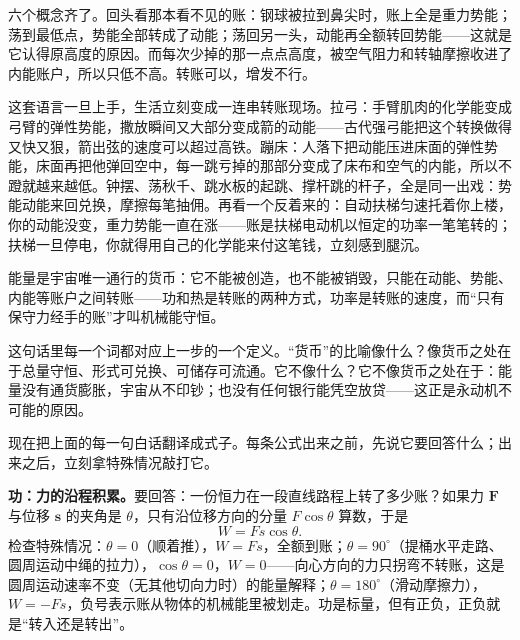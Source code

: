 六个概念齐了。回头看那本看不见的账：钢球被拉到鼻尖时，账上全是重力势能；荡到最低点，势能全部转成了动能；荡回另一头，动能再全额转回势能——这就是它认得原高度的原因。而每次少掉的那一点点高度，被空气阻力和转轴摩擦收进了内能账户，所以只低不高。转账可以，增发不行。

这套语言一旦上手，生活立刻变成一连串转账现场。拉弓：手臂肌肉的化学能变成弓臂的弹性势能，撒放瞬间又大部分变成箭的动能——古代强弓能把这个转换做得又快又狠，箭出弦的速度可以超过高铁。蹦床：人落下把动能压进床面的弹性势能，床面再把他弹回空中，每一跳亏掉的那部分变成了床布和空气的内能，所以不蹬就越来越低。钟摆、荡秋千、跳水板的起跳、撑杆跳的杆子，全是同一出戏：势能动能来回兑换，摩擦每笔抽佣。再看一个反着来的：自动扶梯匀速托着你上楼，你的动能没变，重力势能一直在涨——账是扶梯电动机以恒定的功率一笔笔转的；扶梯一旦停电，你就得用自己的化学能来付这笔钱，立刻感到腿沉。


\begin{oneline}
能量是宇宙唯一通行的货币：它不能被创造，也不能被销毁，只能在动能、势能、内能等账户之间转账——功和热是转账的两种方式，功率是转账的速度，而“只有保守力经手的账”才叫机械能守恒。
\end{oneline}

这句话里每一个词都对应上一步的一个定义。“货币”的比喻像什么？像货币之处在于总量守恒、形式可兑换、可储存可流通。它不像什么？它不像货币之处在于：能量没有通货膨胀，宇宙从不印钞；也没有任何银行能凭空放贷——这正是永动机不可能的原因。


现在把上面的每一句白话翻译成式子。每条公式出来之前，先说它要回答什么；出来之后，立刻拿特殊情况敲打它。

\textbf{功：力的沿程积累。}要回答：一份恒力在一段直线路程上转了多少账？如果力 \(\mathbf F\) 与位移 \(\mathbf s\) 的夹角是 \(\theta\)，只有沿位移方向的分量 \(F\cos\theta\) 算数，于是
\[
W = Fs\cos\theta .
\]
检查特殊情况：\(\theta=0\)（顺着推），\(W=Fs\)，全额到账；\(\theta=90^{\circ}\)（提桶水平走路、圆周运动中绳的拉力），\(\cos\theta=0\)，\(W=0\)——向心方向的力只拐弯不转账，这是圆周运动速率不变（无其他切向力时）的能量解释；\(\theta=180^{\circ}\)（滑动摩擦力），\(W=-Fs\)，负号表示账从物体的机械能里被划走。功是标量，但有正负，正负就是“转入还是转出”。

\begin{center}
\end{center}

